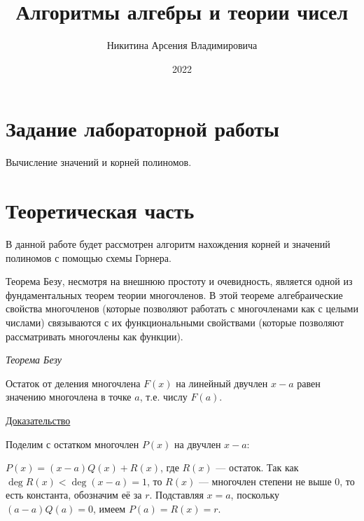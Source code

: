 \documentclass[bachelor, och, labwork]{shiza}
\begin{document}
\title{Алгоритмы алгебры и теории чисел}





\author{Никитина Арсения Владимировича}




\date{2022}

\maketitle



\tableofcontents

\section{Задание лабораторной работы}

Вычисление значений и корней полиномов.

\section{Теоретическая часть}

В данной работе будет рассмотрен алгоритм нахождения корней и значений полиномов
с помощью схемы Горнера.


Теорема Безу, несмотря на внешнюю простоту и очевидность, является одной из 
фундаментальных теорем теории многочленов. В этой теореме алгебраические свойства 
многочленов (которые позволяют работать с многочленами как с целыми числами) 
связываются с их функциональными свойствами (которые позволяют рассматривать 
многочлены как функции).


\begin{center}
    \textit{Теорема Безу}
\end{center}

Остаток от деления многочлена  $F(x)$  на линейный двучлен  $x-a$  равен 
значению многочлена в точке $a$, т.е. числу $F(a)$.

\underline{Доказательство}

Поделим с остатком многочлен $P(x)$ на двучлен $x-a$:

$P(x)=(x-a)Q(x)+R(x)$, где $R(x)$ --- остаток. Так как $\deg R(x)<\deg(x-a)=1$,
то $R(x)$ --- многочлен степени не выше 0, то есть константа, обозначим её за 
$r$. Подставляя $x=a$, поскольку $(a-a)Q(a)=0$, имеем $P(a)=R(x)=r$.
\end{document}
